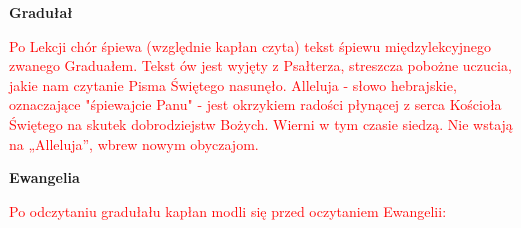 \begin{Parallel}[v]{0.485\textwidth}{0.485\textwidth}

\end{Parallel}

\begin{center}
\textbf{Gradułał}
\end{center}

\begin{center}
\textcolor{red}{Po Lekcji chór śpiewa (względnie kapłan czyta) tekst śpiewu międzylekcyjnego zwanego Graduałem. Tekst ów jest wyjęty z Psałterza, streszcza pobożne uczucia, jakie nam czytanie Pisma Świętego nasunęło. Alleluja - słowo hebrajskie, oznaczające "śpiewajcie Panu" - jest okrzykiem radości płynącej z serca Kościoła Świętego na skutek dobrodziejstw Bożych. Wierni w tym czasie siedzą. Nie wstają na „Alleluja”, wbrew nowym obyczajom.}
\end{center}

\begin{Parallel}[v]{0.485\textwidth}{0.485\textwidth}

\end{Parallel}


\begin{center}
\textbf{Ewangelia}
\end{center}

\begin{center}
\textcolor{red}{Po odczytaniu gradułału kapłan modli się przed oczytaniem Ewangelii:}
\end{center}

